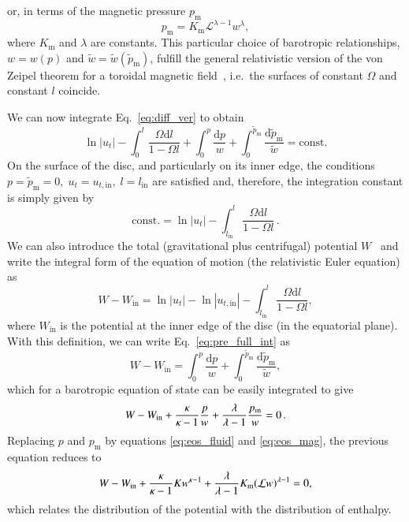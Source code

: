 \documentclass[referee]{aa}
\begin{document}
or, in terms of the magnetic pressure $p_{\mathrm{m}}$
\begin{equation}\label{eq:eos_mag}
p_{\mathrm{m}} = K_{\mathrm{m}} \mathcal{L}^{\lambda
-1} w^{\lambda
},
\end{equation}
where $K_{\mathrm{m}}$ and $\lambda
$ are constants.
This particular choice of barotropic relationships, $w = w(p)$ and $\tilde{w} = \tilde{w}(\tilde{p}_{\mathrm{m}})$, fulfill the general relativistic version of the von Zeipel theorem for a toroidal magnetic field~\citep{vonZeipel:1924, Zanotti:2015}, i.e.~the surfaces of constant $\Omega$ and constant $l$ coincide.

We can now integrate Eq.~\eqref{eq:diff_ver} to obtain
\begin{equation}\label{eq:pre_full_int}
\ln |u_t| - \int^l_0 \frac{\Omega \mathrm{d}l}{1 - \Omega l} + \int^p_0 \frac{\mathrm{d}p}{w} + \int_0^{\tilde{p}_{\mathrm{m}}} \frac{\mathrm{d}\tilde{p}_{\mathrm{m}}}{\tilde{w}} = \mathrm{const}.
\end{equation}
On the surface of the disc, and particularly on its inner edge, the conditions
$p = \tilde{p}_{\mathrm{m}} = 0, \; u_t = u_{t, \mathrm{in}}, \; l = l_{\mathrm{in}}$
are satisfied and, therefore, the integration constant is simply given by
\begin{equation}
\mathrm{const.} = \ln |u_t| - \int^l_{l_\mathrm{in}} \frac{\Omega \mathrm{d}l}{1 - \Omega l}\,.
\end{equation}
We can also introduce the total (gravitational plus centrifugal) potential $W$~\citep{Abramowicz:1978} and write the integral form of the equation of motion (the relativistic Euler equation) as
\begin{equation}\label{eq:potential}
W - W_{\mathrm{in}} = \ln|u_t| - \ln|u_{t,\mathrm{in}}| - \int^{l}_{l_{\mathrm{in}}} \frac{\Omega \mathrm{d}l}{1 - \Omega l},
\end{equation}
where $W_{\mathrm{in}}$ is the potential at the inner edge of the disc (in the equatorial plane). With this definition, we can write Eq.~\eqref{eq:pre_full_int} as
\begin{equation}\label{eq:full_int}
W - W_{\mathrm{in}} = \int^p_0 \frac{\mathrm{d}p}{w} + \int_0^{\tilde{p}_{\mathrm{m}}} \frac{\mathrm{d}\tilde{p}_{\mathrm{m}}}{\tilde{w}},
\end{equation}
which for a barotropic equation of state can be easily integrated to give
\begin{equation}\label{eq:pre_enthalpy_eq}
W - W_{\rm{in}} + \frac{\kappa}{\kappa - 1}\frac{p}{w} + \frac{\lambda
}{\lambda
 - 1}\frac{p_{\mathrm{m}}}{w} = 0\,.
\end{equation}
Replacing $p$ and $p_{\mathrm{m}}$ by equations \eqref{eq:eos_fluid} and \eqref{eq:eos_mag}, the previous equation reduces to
\begin{equation}\label{eq:enthalpy_eq}
W - W_{\rm{in}} + \frac{\kappa}{\kappa - 1} K w^{\kappa - 1} + \frac{\lambda
}{\lambda
 - 1}K_{\mathrm{m}}(\mathcal{L} w)^{\lambda
 - 1} = 0,
\end{equation}
which relates the distribution of the potential with the distribution of enthalpy.
\end{document}
